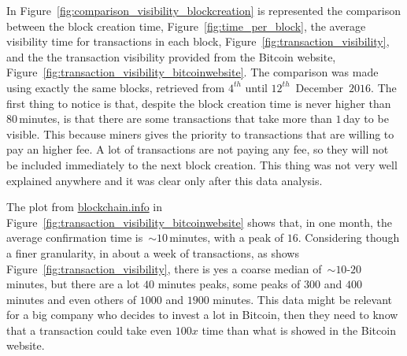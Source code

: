 \documentclass[USenglish]{uit-thesis}
\begin{document}
In Figure~\ref{fig:comparison_visibility_blockcreation} is represented the comparison between
the block creation time, Figure~\ref{fig:time_per_block}, the average visibility time for
transactions in each block,
Figure~\ref{fig:transaction_visibility}, and the the transaction
visibility provided from the Bitcoin website, Figure~\ref{fig:transaction_visibility_bitcoinwebsite}.
The comparison was made using exactly the same
blocks, retrieved from $4^{th}$ until $12^{th}$~December~$2016$. The first thing to notice is that,
despite the block creation time is never higher than $80$\,minutes, is that there are some
transactions
that take more than $1$\,day to be visible. This because miners gives the priority to transactions that are
willing to pay an higher fee. A lot of transactions are not paying any fee, so they
will not be included immediately to the next block creation. This thing was not very well explained anywhere
and it was clear only after this data analysis.

The plot from \url{blockchain.info} in Figure~\ref{fig:transaction_visibility_bitcoinwebsite} shows that,
in one month, the average confirmation time is~$\sim10$\,minutes, with a peak of $16$.
Considering though a finer granularity, in about a week of transactions, as shows Figure~\ref{fig:transaction_visibility},
there is yes a coarse median of~$\sim10$-$20$ minutes, but there are a lot $40$ minutes peaks, some peaks
of $300$ and $400$ minutes and even others of $1000$ and $1900$ minutes.
This data might be relevant for a big company who decides to invest a lot in Bitcoin, then
they need to know that a transaction could take even $100x$ time than what is showed
in the Bitcoin website.
\end{document}
